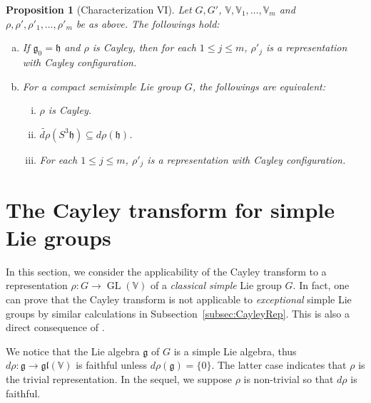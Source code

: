\documentclass[11pt,reqno]{amsart}
\DeclareMathOperator{\GL}{GL}
\newtheorem{proposition}[theorem]{Proposition}
\begin{document}
\begin{proposition}[Characterization VI]\label{prop:Characterization VI}
Let $G,  G'$,  $\mathbb{V},  \mathbb{V}_1,\dots,  \mathbb{V}_m$ and $\rho,  \rho', \rho'_1,  \dots,  \rho'_m$ be as above.  The followings hold:
\begin{enumerate}[(a)]
\item If $\mathfrak{g}_0 = \mathfrak{h}$ and $\rho$ is Cayley,  then for each $1 \le j \le m$,  $\rho'_j$ is a representation with Cayley configuration.
\item For a compact semisimple Lie group $G$,  the followings are equivalent:
\begin{enumerate}[(i)]
\item $\rho$ is Cayley. 
\item $\widetilde{d\rho} \left( S^3 \mathfrak{h} \right) \subseteq d \rho (\mathfrak{h})$.
\item For each $1 \le j \le m$,  $\rho'_j$ is a representation with Cayley configuration.
\end{enumerate}

\end{enumerate} 
\end{proposition}
\section{The Cayley transform for simple Lie groups}\label{sec:simple}
In this section,  we consider the applicability of the Cayley transform to a representation $\rho: G \to \GL(\mathbb{V})$ of a \emph{classical simple} Lie group $G$.  In fact,  one can prove that the Cayley transform is not applicable to \emph{exceptional} simple Lie groups by similar calculations in Subsection~\ref{subsec:CayleyRep}.  This is also a direct consequence of \cite[Theorem 1.31]{LPR06}.

We notice that the Lie algebra $\mathfrak{g}$ of $G$ is a simple Lie algebra,  thus $d \rho:  \mathfrak{g} \to \mathfrak{gl}(\mathbb{V})$ is faithful unless $d\rho (\mathfrak{g}) = \{ 0 \}$.  The latter case indicates that $\rho$ is the trivial representation.  In the sequel,  we suppose $\rho$ is non-trivial so that $d\rho$ is faithful.  
\end{document}
